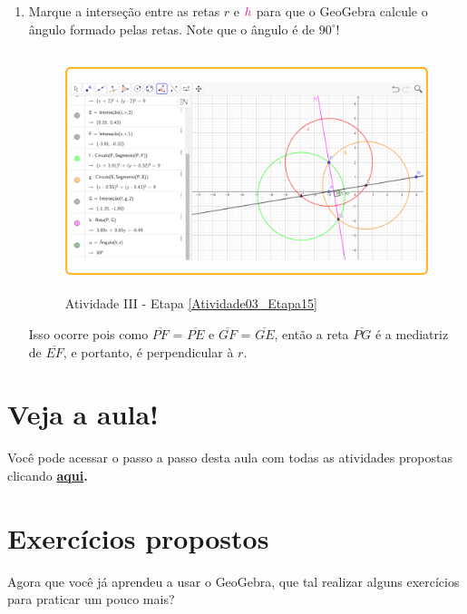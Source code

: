 \documentclass[11pt,a4paper]{article}
\begin{document}
\begin{enumerate}[{Etapa} 1.]
\item Marque a interseção entre as retas $r$ e ${\color{magenta}{h}}$ para que o GeoGebra calcule o ângulo formado pelas retas. Note que o ângulo é de $90^\circ$! \label{Atividade03_Etapa15}
\begin{figure}[H]
    \centering
    \includegraphics[height=7cm]{Figuras/T01_Atividade03_Fig06.png}
    \caption{Atividade III - Etapa \ref{Atividade03_Etapa15}}
    \label{Atividade03_Etapa15_Imagem}
\end{figure}

Isso ocorre pois como $\overline{PF}$ = $\overline{PE}$ e $\overline{GF}$ = $\overline{GE}$, então a reta $\overline{PG}$ é a mediatriz de $\overline{EF}$, e portanto, é perpendicular à $r$.
\end{enumerate}

\newpage 

\section{Veja a aula!}
Você pode acessar o passo a passo desta aula com todas as atividades propostas clicando \bf{\href{https://www.geogebra.org/m/v5cyvu8t}{aqui}}.

\newpage
\section{Exercícios propostos}

Agora que você já aprendeu a usar o GeoGebra, que tal realizar alguns exercícios para praticar um pouco mais?
\end{document}
